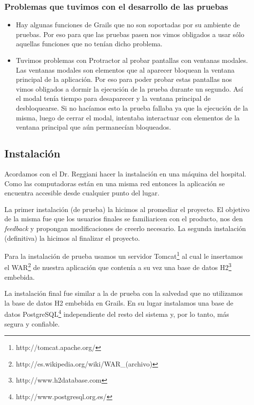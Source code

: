 \subsubsection{Problemas que tuvimos con el desarrollo de las pruebas}
\begin{itemize}
\item Hay algunas funciones de Grails que no son soportadas por su ambiente de pruebas. Por eso para que las pruebas pasen nos vimos obligados a usar sólo aquellas funciones que no tenían dicho problema.
\item Tuvimos problemas con Protractor al probar pantallas con ventanas modales. Las ventanas modales son elementos que al aparecer bloquean la ventana principal de la aplicación. Por eso para poder probar estas pantallas nos vimos obligados a dormir la ejecución de la prueba durante un segundo. Así el modal tenía tiempo para desaparecer y la ventana principal de desbloquearse. Si no hacíamos esto la prueba fallaba ya que la ejecución de la misma, luego de cerrar el modal, intentaba interactuar con elementos de la ventana principal que aún permanecían bloqueados.
\end{itemize}

\subsection{Instalación}
Acordamos con el Dr. Reggiani hacer la instalación en una máquina del hospital. Como las computadoras están en una misma red entonces la aplicación se encuentra accesible desde cualquier punto del lugar.

La primer instalación (de prueba) la hicimos al promediar el proyecto. El objetivo de la misma fue que los usuarios finales se familiaricen con el producto, nos den \textit{feedback} y propongan modificaciones de creerlo necesario. La segunda instalación (definitiva) la hicimos al finalizar el proyecto.

Para la instalación de prueba usamos un servidor Tomcat\footnote{http://tomcat.apache.org/} al cual le insertamos el WAR\footnote{http://es.wikipedia.org/wiki/WAR\_(archivo)} de nuestra aplicación que contenía a su vez una base de datos H2\footnote{http://www.h2database.com} embebida.

La instalación final fue similar a la de prueba con la salvedad que no utilizamos la base de datos H2 embebida en Grails. En su lugar instalamos una base de datos PostgreSQL\footnote{http://www.postgresql.org.es/} independiente del resto del sistema y, por lo tanto, más segura y confiable.